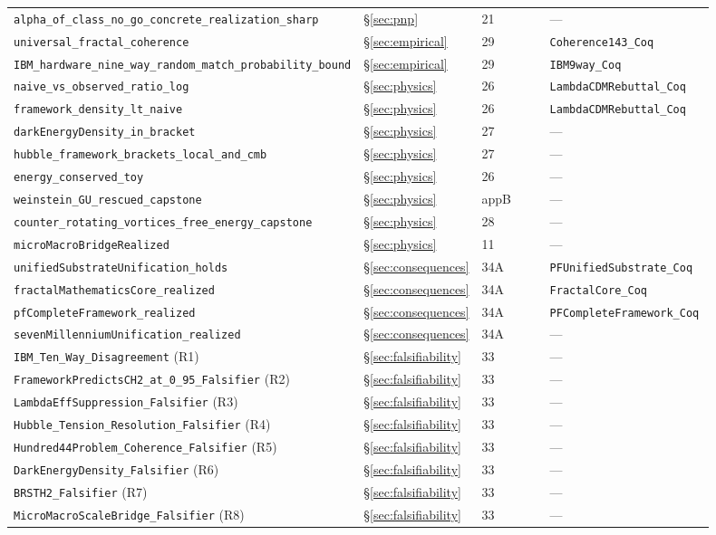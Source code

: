 \documentclass[11pt,a4paper]{article}
\theoremstyle{definition}
\theoremstyle{remark}
\newcommand{\lean}[1]{\texttt{\small #1}}
\begin{document}
\begin{longtable}{p{0.40\linewidth} p{0.13\linewidth} p{0.13\linewidth} p{0.24\linewidth}}
\lean{alpha\_of\_class\_no\_go\_concrete\_realization\_sharp} & \S\ref{sec:pnp} & 21 & --- \\
\lean{universal\_fractal\_coherence} & \S\ref{sec:empirical} & 29 & \lean{Coherence143\_Coq} \\
\lean{IBM\_hardware\_nine\_way\_random\_match\_probability\_bound} & \S\ref{sec:empirical} & 29 & \lean{IBM9way\_Coq} \\
\lean{naive\_vs\_observed\_ratio\_log} & \S\ref{sec:physics} & 26 & \lean{LambdaCDMRebuttal\_Coq} \\
\lean{framework\_density\_lt\_naive} & \S\ref{sec:physics} & 26 & \lean{LambdaCDMRebuttal\_Coq} \\
\lean{darkEnergyDensity\_in\_bracket} & \S\ref{sec:physics} & 27 & --- \\
\lean{hubble\_framework\_brackets\_local\_and\_cmb} & \S\ref{sec:physics} & 27 & --- \\
\lean{energy\_conserved\_toy} & \S\ref{sec:physics} & 26 & --- \\
\lean{weinstein\_GU\_rescued\_capstone} & \S\ref{sec:physics} & appB & --- \\
\lean{counter\_rotating\_vortices\_free\_energy\_capstone} & \S\ref{sec:physics} & 28 & --- \\
\lean{microMacroBridgeRealized} & \S\ref{sec:physics} & 11 & --- \\
\lean{unifiedSubstrateUnification\_holds} & \S\ref{sec:consequences} & 34A & \lean{PFUnifiedSubstrate\_Coq} \\
\lean{fractalMathematicsCore\_realized} & \S\ref{sec:consequences} & 34A & \lean{FractalCore\_Coq} \\
\lean{pfCompleteFramework\_realized} & \S\ref{sec:consequences} & 34A & \lean{PFCompleteFramework\_Coq} \\
\lean{sevenMillenniumUnification\_realized} & \S\ref{sec:consequences} & 34A & --- \\
\lean{IBM\_Ten\_Way\_Disagreement} (R1) & \S\ref{sec:falsifiability} & 33 & --- \\
\lean{FrameworkPredictsCH2\_at\_0\_95\_Falsifier} (R2) & \S\ref{sec:falsifiability} & 33 & --- \\
\lean{LambdaEffSuppression\_Falsifier} (R3) & \S\ref{sec:falsifiability} & 33 & --- \\
\lean{Hubble\_Tension\_Resolution\_Falsifier} (R4) & \S\ref{sec:falsifiability} & 33 & --- \\
\lean{Hundred44Problem\_Coherence\_Falsifier} (R5) & \S\ref{sec:falsifiability} & 33 & --- \\
\lean{DarkEnergyDensity\_Falsifier} (R6) & \S\ref{sec:falsifiability} & 33 & --- \\
\lean{BRSTH2\_Falsifier} (R7) & \S\ref{sec:falsifiability} & 33 & --- \\
\lean{MicroMacroScaleBridge\_Falsifier} (R8) & \S\ref{sec:falsifiability} & 33 & --- \\
\bottomrule
\end{longtable}
\end{document}
